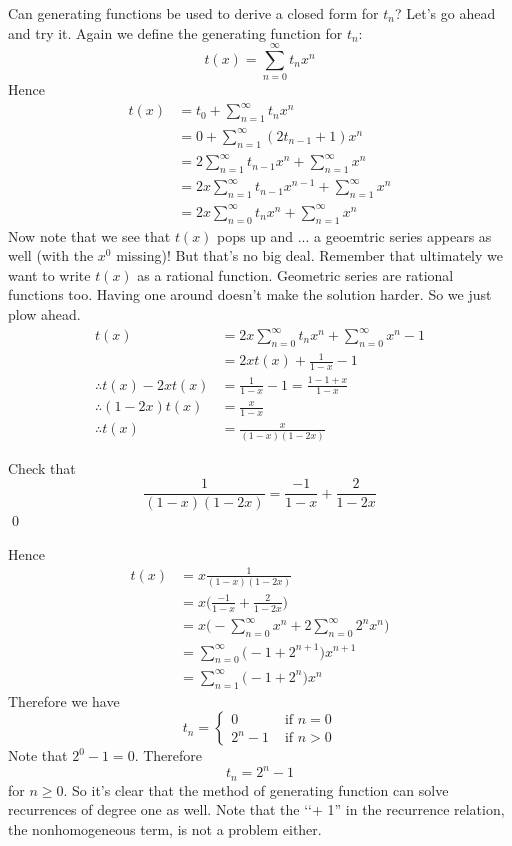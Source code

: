 Can generating functions be used to derive a closed form for $t_n$?
Let's go ahead and try it.
Again we define the generating function for $t_n$:
\[
t(x) = \sum_{n=0}^\infty t_n x^n
\]
Hence
\begin{align*}
t(x) 
&= t_0 + \sum_{n=1}^\infty t_n x^n \\
&= 0 + \sum_{n=1}^\infty (2t_{n-1} + 1) x^n \\
&= 2 \sum_{n=1}^\infty t_{n-1} x^n + \sum_{n=1}^\infty x^n \\
&= 2 x \sum_{n=1}^\infty t_{n-1} x^{n-1} + \sum_{n=1}^\infty x^n \\
&= 2 x \sum_{n=0}^\infty t_{n} x^{n} + \sum_{n=1}^\infty x^n 
\end{align*}
Now note that we see that $t(x)$ pops up and ... a geoemtric
series appears as well (with the $x^0$ missing)!
But that's no  big deal.
Remember that ultimately we want to write $t(x)$ as a rational
function.
Geometric series are rational functions too.
Having one around doesn't make the solution harder.
So we just plow ahead.
\begin{align*}
t(x) 
&= 2 x \sum_{n=0}^\infty t_{n} x^{n} + \sum_{n=0}^\infty x^n - 1\\
&= 2x t(x) + \frac{1}{1-x} - 1\\
\therefore
t(x) - 2x t(x)  
&= \frac{1}{1-x} - 1 = \frac{1-1+x}{1-x}\\
\therefore
(1 - 2x)t(x)  
&= \frac{x}{1-x}\\
\therefore
t(x)  
&= \frac{x}{(1-x)(1 - 2x)}
\end{align*}



\newpage
\begin{ex}
Check that 
\[
\frac{1}{(1-x)(1 - 2x)}
= \frac{-1}{1-x} + \frac{2}{1-2x}
\]
\qed
\end{ex}

Hence
\begin{align*}
t(x) 
&= x \frac{1}{(1-x)(1-2x)} \\
&= x \biggl( \frac{-1}{1-x} + \frac{2}{1-2x} \biggr) \\
&= x \biggl( -\sum_{n=0}^\infty x^n + 2 \sum_{n=0}^\infty 2^n x^n \biggr) \\
&= \sum_{n=0}^\infty \bigl ( -1 + 2^{n+1} \bigr )x^{n+1} \\
&= \sum_{n=1}^\infty \bigl ( -1 + 2^n \bigr )x^{n}
\end{align*}
Therefore we have
\[
t_n = 
\begin{cases}
0       &\text{ if } n = 0 \\
2^n - 1 &\text{ if } n > 0
\end{cases}
\]
Note that $2^0 - 1 = 0$. 
Therefore
\[
t_n = 2^n - 1
\]
for $n \geq 0$.
So it's clear that the method of generating function can solve
recurrences of degree one as well.
Note that the \lq\lq + 1'' in the recurrence relation, the nonhomogeneous term,
is not a problem either.
